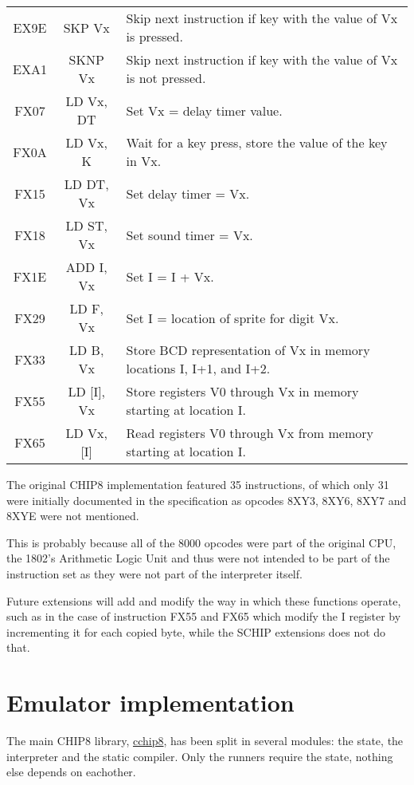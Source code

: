 \begin{longtable}{|c|c|p{9cm}|}
EX9E & SKP Vx & Skip next instruction if key with the value of Vx is pressed. \\
EXA1 & SKNP Vx & Skip next instruction if key with the value of Vx is not pressed. \\
FX07 & LD Vx, DT & Set Vx = delay timer value. \\
FX0A & LD Vx, K & Wait for a key press, store the value of the key in Vx. \\
FX15 & LD DT, Vx & Set delay timer = Vx. \\
FX18 & LD ST, Vx & Set sound timer = Vx. \\
FX1E & ADD I, Vx & Set I = I + Vx. \\
FX29 & LD F, Vx & Set I = location of sprite for digit Vx. \\
FX33 & LD B, Vx & Store BCD representation of Vx in memory locations I, I+1, and I+2. \\
FX55 & LD [I], Vx & Store registers V0 through Vx in memory starting at location I. \\
FX65 & LD Vx, [I] & Read registers V0 through Vx from memory starting at location I. \\
\end{longtable}

\par The original CHIP8 implementation featured 35 instructions, of which only 31 were initially documented in the specification as opcodes 8XY3, 8XY6, 8XY7 and 8XYE were not mentioned.

\par This is probably because all of the 8000 opcodes were part of the original CPU, the 1802's Arithmetic Logic Unit and thus were not intended to be part of the instruction set as they were not part of the interpreter itself.

\par Future extensions will add and modify the way in which these functions operate, such as in the case of instruction FX55 and FX65 which modify the I register by incrementing it for each copied byte, while the SCHIP extensions does not do that.

\clearpage

\section{Emulator implementation}
\label{sec:ch3sec3}

\par The main CHIP8 library, \href{https://github.com/solomonarul/cchip8}{cchip8}, has been split in several modules: the state, the interpreter and the static compiler. Only the runners require the state, nothing else depends on eachother.

